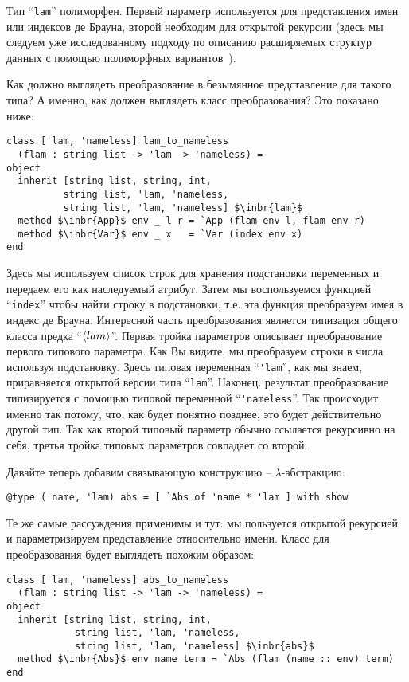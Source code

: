 Тип ``\lstinline{lam}'' полиморфен. Первый параметр используется для представления имен или индексов де Брауна, второй необходим для открытой рекурсии (здесь мы следуем уже исследованному подходу по описанию расширяемых структур данных с помощью полиморфных 
вариантов~\cite{PolyVarReuse}).

Как должно выглядеть преобразование в безымянное представление для такого типа? А именно, как должен выглядеть класс преобразования? Это показано ниже:

\begin{lstlisting}
class ['lam, 'nameless] lam_to_nameless
  (flam : string list -> 'lam -> 'nameless) =
object
  inherit [string list, string, int,
          string list, 'lam, 'nameless,
          string list, 'lam, 'nameless] $\inbr{lam}$
  method $\inbr{App}$ env _ l r = `App (flam env l, flam env r)
  method $\inbr{Var}$ env _ x   = `Var (index env x)
end
\end{lstlisting}

Здесь мы используем список строк для хранения подстановки переменных и  передаем его как наследуемый атрибут. Затем мы воспользуемся функцией 
``\lstinline{index}'' чтобы найти строку в подстановки, т.е.  эта функция преобразуем имея в индекс де Брауна. 
Интересной часть преобразования является типизация общего класса предка ``$\left<lam\right>$''. 
Первая тройка параметров описывает преобразование первого типового параметра. Как Вы видите, мы преобразуем строки в числа используя подстановку.
Здесь типовая переменная ``\lstinline{'lam}'', как мы знаем, приравняется открытой версии типа ``\lstinline{lam}''.
Наконец. результат преобразование типизируется с помощью типовой переменной ``\lstinline{'nameless}''. 
Так происходит именно так потому, что, как будет понятно позднее,  это будет действительно другой тип.
Так как второй типовый параметр обычно ссылается рекурсивно на себя, третья тройка типовых параметров совпадает со второй.

Давайте теперь добавим связывающую конструкцию -- $\lambda$-абстракцию:

\begin{lstlisting}
@type ('name, 'lam) abs = [ `Abs of 'name * 'lam ] with show
\end{lstlisting}

Те же самые рассуждения применимы и тут: мы пользуется открытой рекурсией и параметризируем представление относительно имени.
Класс для преобразования будет выглядеть похожим образом:

\begin{lstlisting}
class ['lam, 'nameless] abs_to_nameless
  (flam : string list -> 'lam -> 'nameless) =
object
  inherit [string list, string, int,
            string list, 'lam, 'nameless,
            string list, 'lam, 'nameless] $\inbr{abs}$
  method $\inbr{Abs}$ env name term = `Abs (flam (name :: env) term)
end
\end{lstlisting}

